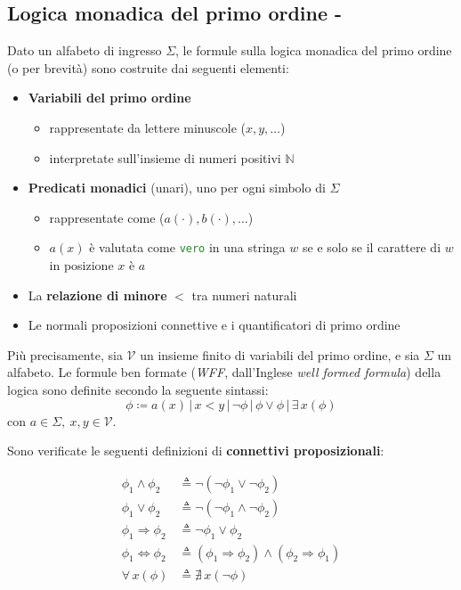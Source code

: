 \documentclass[italian, 10pt]{article}
\newcommand{\vero}{\textcolor{ForestGreen}{\texttt{vero}}\xspace} %
\begin{document}
\subsection{Logica monadica del primo ordine - \MFO}
\label{sec:logica-monadica-primo-ordine}

Dato un alfabeto di ingresso \(\Sigma\), le formule sulla logica monadica del primo ordine (o \MFO per brevità) sono costruite dai seguenti elementi:

\begin{itemize}
  \item \textbf{Variabili del primo ordine}
        \begin{itemize}
          \item rappresentate da lettere minuscole (\(x, y, \ldots\))
          \item interpretate sull'insieme di numeri positivi \(\mathbb{N}\)
        \end{itemize}
  \item \textbf{Predicati monadici} (unari), uno per ogni simbolo di \(\Sigma\)
        \begin{itemize}
          \item rappresentate come (\(a(\cdot), b(\cdot), \ldots\))
          \item \(a(x)\) è valutata come \vero in una stringa \(w\) se e solo se il carattere di \(w\) in posizione \(x\) è \(a\)
        \end{itemize}
  \item La \textbf{relazione di minore} \(<\) tra numeri naturali
  \item Le normali proposizioni connettive e i quantificatori di primo ordine
\end{itemize}

Più precisamente, sia \(\mathcal{V}\) un insieme finito di variabili del primo ordine, e sia \(\Sigma\) un alfabeto.
Le formule ben formate (\textit{WFF}, dall'Inglese \textit{well formed formula}) della logica \MFO sono definite secondo la seguente sintassi:
\[ \phi \coloneqq a(x) \, | \, x < y \, | \, \lnot \phi \, | \, \phi \lor \phi \, | \, \exists \, x(\phi) \]
con \(a \in \Sigma, \ x, y \in \mathcal{V}\).

\bigskip
Sono verificate le seguenti definizioni di \textbf{connettivi proposizionali}:

\begin{align*}
  \phi_1 \land \phi_2           & \triangleq \lnot (\lnot \phi_1 \lor \lnot \phi_2)                            \\
  \phi_1 \lor \phi_2            & \triangleq \lnot (\lnot \phi_1 \land \lnot \phi_2)                           \\
  \phi_1 \Rightarrow \phi_2     & \triangleq \lnot \phi_1 \lor \phi_2                                          \\
  \phi_1 \Leftrightarrow \phi_2 & \triangleq ( \phi_1 \Rightarrow \phi_2 ) \land ( \phi_2 \Rightarrow \phi_1 ) \\
  \forall \, x (\phi)           & \triangleq \nexists \, x (\lnot \phi)
\end{align*}
\end{document}
